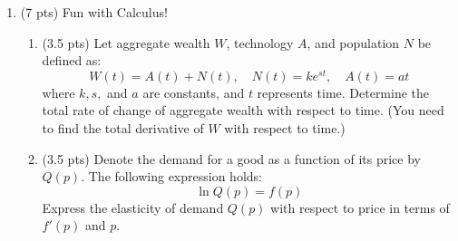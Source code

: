 \documentclass{./../../../Latex/tests}
\begin{document}
\begin{enumerate}
\newpage
\item (7 pts) Fun with Calculus!
\begin{enumerate}
\item (3.5 pts) Let aggregate wealth \( W \), technology $A$, and population \( N \) be defined as:
\[
W(t) = A(t) + N(t), \quad N(t) = k e^{st}, \quad A(t) = at
\]
where \(k, s,\) and \( a \) are constants, and \( t \) represents time. Determine the total rate of change of aggregate wealth with respect to time. (You need to find the total derivative of $W$ with respect to time.)
\vspace{6cm}
\item (3.5 pts) Denote the demand for a good as a function of its price by $Q(p)$. The following expression holds:
$$ \ln Q(p) =  f(p)  $$
Express the elasticity of demand $Q(p)$ with respect to price in terms of $f'(p)$ and $p$. 
\end{enumerate}
\end{enumerate}
\end{document}
